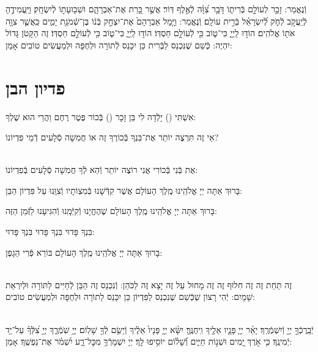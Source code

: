 \documentclass[twoside, openany, parskip=half, 11pt]{book}
\begin{document}

וְֿנֶאֱמַר: זָכַ֣ר לְעוֹלָ֣ם בְּֿרִית֑וֹ דָּבָ֥ר צִ֝וָּ֗ה לְֿאֶ֣לֶף דּֽוֹר׃ אֲשֶׁ֣ר כָּ֭רַת אֶת־אַבְרָהָ֑ם
וּשְׁב֖וּעָת֣וֹ לְֿיִשְׂחָֽק׃ וַיַּֽעֲמִידֶ֣הָ לְֿיַֽעֲקֹ֣ב לְֿחֹ֑ק לְֿ֝יִשְׂרָאֵ֗ל בְּֿרִ֣ית עוֹלָֽם׃
וְֿנֶאֱמַר: וַיָּ֤מָל אַבְרָהָם֙ אֶת־יִצְחָ֣ק בְּֿנ֔וֹ בֶּן־שְֿׁמֹנַ֖ת יָמִ֑ים כַּֽאֲשֶׁ֛ר צִוָּ֥ה אֹת֖וֹ אֱלֹהִֽים׃ הוֹד֣וּ לַֽיְיָ֑ כִּי־ט֑וֹב כִּ֖י לְֿעוֹלָ֣ם חַסְדּֽוֹ׃
הוֹד֣וּ לַֽיְיָ֑ כִּי־ט֑וֹב כִּ֖י לְֿעוֹלָ֣ם חַסְדּֽוֹ׃
 זֶה הַקָּטֹן גָּדוֹל יִהְיֶה:
כְּֿשֵׁם שֶׁנִּכְנַס לַבְּֿרִית כֵּן יִכָּנֵס לְֿתוֹרָה וּלְחֻפָּה וּלְמַעֲשִׂים טוֹבִים אָמֵן:

\vfill
\sepline

\chapter[פדיון הבן]{ פדיון הבן }


אִשְׁתִּי () יָלְֿדָה לִי בֵּן זָכָר () בְּֿכוֹר פֶּטֶר רֶחֶם וַהֲרֵי הוּא שֶׁלְךָ:

אֵי זֶה תִּרְצֶה יוֹתֵר אֶת־בִּנְךָ בְּֿכוֹרֶךָ זֶה אוֹ חֲמִשָׁה סְֿלָעִים דְֿמֵי פִּדְיוֹנוֹ?

\\
אֶת בְּֿנִי בְּֿכוֹרִי אֲנִי רוֹצֶה יוֹתֵר וְֿהֵא לְֿךָ חֲמִשָׁה סְֿלָעִים בְּֿפִדְיוֹנוֹ:

בָּרוּךְ אַתָּה יְיָ אֱלֹהֵֽינוּ מֶֽלֶךְ הָעוֹלָם אֲשֶׁר קִדְּֿשָׁנוּ בְּֿמִצְוֹתָיו וְֿצִוָּֽנוּ עַל פִּדְיוֹן הַבֵּן:

בָּרוּךְ אַתָּה יְיָ אֱלֹהֵֽינוּ מֶֽלֶךְ הָעוֹלָם שֶׁהֶחֱיָנוּ וְֿקִיְּֿמָֽנוּ וְֿהִגִּיעָנוּ לַזְּֿמַן הַזֶּה:


בִּנְךָ פָּדוּי בִּנְךָ פָּדוּי בִּנְךָ פָּדוּי:

בָּרוּךְ אַתָּה יְיָ אֱלֹהֵֽינוּ מֶֽלֶךְ הָעוֹלָם בּוֹרֵא פְּֿרִי הַגָפֶן:

 \\
זֶה תַּחַת זֶה זֶה חִלוּף זֶה זֶה מָחוּל עַל זֶה יָצָא זֶה לַכֹּהֵן:
וְֿנִכְנַס זֶה הַבֵּן לְֿחַיִּים לַתּוֹרָה וּלְיִרְאַת שָׁמָיִם:
יְֿהִי רָצוֹן שֶׁכְּֿשֵׁם שֶׁנִכְנַס לַפִּדְיוֹן כֵּן יִכָּנֵס לַתוֹרָה וּלְחֻפָּה וּלְמַעֲשִׂים טוֹבִים:

\\
יְֿבָֽרֶכְֿךָ֣ יְיָ֖ וְֿיִשְׁמְֿרֶֽךָ׃ יָאֵ֨ר יְיָ֧ פָּנָ֛יו אֵלֶ֖יךָ וִֽיחֻנֶּֽךָּ׃ יִשָּׂ֨א יְיָ֤ פָּנָיו֙ אֵלֶ֔יךָ וְֿיָשֵׂ֥ם לְֿךָ֖ שָׁלֽוֹם׃
יְיָ֥ שֹֽׁמְֿרֶ֑ךָ יְיָ֥ צִ֝לְּֿךָ֗ עַל־יַ֥ד יְֿמִינֶֽךָ׃
כִּ֤י אֹ֣רֶךְ יָ֭מִים וּשְׁנ֣וֹת חַיִּ֑ים וְֿ֝שָׁל֗וֹם יוֹסִ֥יפוּ לָֽךְ׃
יְיָׄ יִשְׁמָרְֿךָ֥ מִכׇּל־רָ֑ע יִ֝שְׁמֹ֗ר אֶת־נַפְשֶֽׁךָ׃ אָמֵן:
\end{document}
